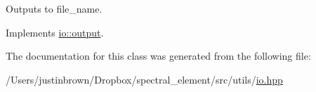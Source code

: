 Outputs to file\-\_\-name. 



 

Implements \hyperlink{classio_1_1output_aae295dd37ca6397fcf8c2109f2c0e418}{io\-::output}.



The documentation for this class was generated from the following file\-:\begin{DoxyCompactItemize}
\item 
/\-Users/justinbrown/\-Dropbox/spectral\-\_\-element/src/utils/\hyperlink{io_8hpp}{io.\-hpp}\end{DoxyCompactItemize}
